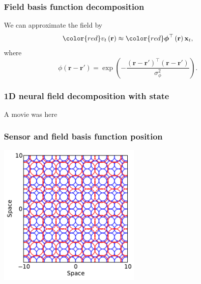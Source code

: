 \documentclass[compress]{beamer}
\begin{document}
\begin{frame}\frametitle{Field basis function decomposition}
We can approximate the field by
\begin{equation}
		\label{DefFieldDecomp} {\color{red}v_t\left(\mathbf{r}\right)} \approx {\color{red}\boldsymbol{\phi}^{\top}\left(\mathbf{r}\right) \mathbf{x}_t},
\end{equation}
where
$$ \phi\left(\mathbf{r}-\mathbf{r}'\right) =
\exp{\left(-\frac{(\mathbf{r}-\mathbf{r}')^\top(\mathbf{r}-\mathbf{r}')}{\sigma_{\phi}^2}\right)}. $$
\end{frame}

% 

\begin{frame} \frametitle{1D neural field decomposition with state}
	A movie was here
\end{frame}

\begin{frame}\frametitle{Sensor and field basis function position}
	\begin{center}
		\includegraphics[height=7cm]{./Figures/FieldAndSensors.pdf}
	\end{center}
\end{frame}
\end{document}

